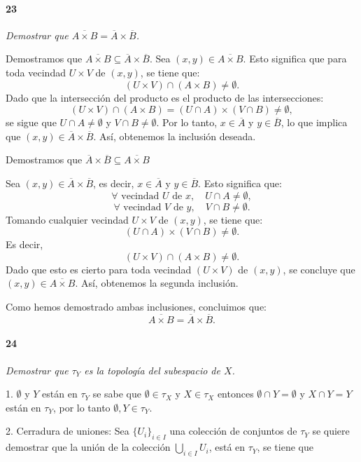 \documentclass[12pt]{article}
\begin{document}
\paragraph{23}
\textit{Demostrar que \(\overline{A \times B} = \overline{A} \times \overline{B}\).}

Demostramos que $\overline{A \times B} \subseteq \overline{A} \times \overline{B}$. Sea $(x, y) \in \overline{A \times B}$. Esto significa que para toda vecindad $U \times V$ de $(x, y)$, se tiene que:
\[
(U \times V) \cap (A \times B) \neq \emptyset.
\]
Dado que la intersección del producto es el producto de las intersecciones:
\[
(U \times V) \cap (A \times B) = (U \cap A) \times (V \cap B) \neq \emptyset,
\]
se sigue que $U \cap A \neq \emptyset$ y $V \cap B \neq \emptyset$.
Por lo tanto, $x \in \overline{A}$ y $y \in \overline{B}$, lo que implica que $(x, y) \in \overline{A} \times \overline{B}$. Así, obtenemos la inclusión deseada.

Demostramos que $\overline{A} \times \overline{B} \subseteq \overline{A \times B}$

Sea $(x, y) \in \overline{A} \times \overline{B}$, es decir, $x \in \overline{A}$ y $y \in \overline{B}$. Esto significa que:
\[
\forall \text{ vecindad } U \text{ de } x, \quad U \cap A \neq \emptyset,
\]
\[
\forall \text{ vecindad } V \text{ de } y, \quad V \cap B \neq \emptyset.
\]
Tomando cualquier vecindad $U \times V$ de $(x, y)$, se tiene que:
\[
(U \cap A) \times (V \cap B) \neq \emptyset.
\]
Es decir,
\[
(U \times V) \cap (A \times B) \neq \emptyset.
\]
Dado que esto es cierto para toda vecindad $(U \times V)$ de $(x, y)$, se concluye que $(x, y) \in \overline{A \times B}$. Así, obtenemos la segunda inclusión.

Como hemos demostrado ambas inclusiones, concluimos que:
\[
\overline{A \times B} = \overline{A} \times \overline{B}.
\]

\paragraph{24}
\textit{Demostrar que \(\tau_Y\) es la topología del subespacio de \( X \).}

1. \( \emptyset \) y \( Y \) est\'an en \( \tau_Y \) se sabe que \( \emptyset \in \tau_X \) y \( X \in \tau_X \)
entonces \( \emptyset \cap Y = \emptyset \) y \( X \cap Y = Y \) están en \( \tau_Y \), por lo tanto \( \emptyset, Y \in \tau_Y \).

2. Cerradura de uniones: Sea \( \{ U_i \}_{i \in I} \) una colecci\'on de conjuntos de \( \tau_Y \)
se quiere demostrar que la unión de la colecci\'on \( \bigcup_{i \in I} U_i \), está en \( \tau_Y \), se tiene que
\end{document}
